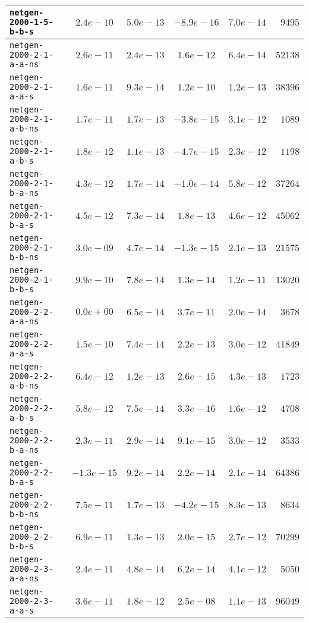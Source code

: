 \begin{center}
\begin{longtable}{|l || c | c | c | c | r|}
\hline
\texttt{netgen-2000-1-5-b-b-s} & $2.4e-10$ & $5.0e-13$ & $-8.9e-16$ & $7.0e-14$ & $9495$ \\
\hline
\texttt{netgen-2000-2-1-a-a-ns} & $2.6e-11$ & $2.4e-13$ & $1.6e-12$ & $6.4e-14$ & $52138$ \\
\hline
\texttt{netgen-2000-2-1-a-a-s} & $1.6e-11$ & $9.3e-14$ & $1.2e-10$ & $1.2e-13$ & $38396$ \\
\hline
\texttt{netgen-2000-2-1-a-b-ns} & $1.7e-11$ & $1.7e-13$ & $-3.8e-15$ & $3.1e-12$ & $1089$ \\
\hline
\texttt{netgen-2000-2-1-a-b-s} & $1.8e-12$ & $1.1e-13$ & $-4.7e-15$ & $2.3e-12$ & $1198$ \\
\hline
\texttt{netgen-2000-2-1-b-a-ns} & $4.3e-12$ & $1.7e-14$ & $-1.0e-14$ & $5.8e-12$ & $37264$ \\
\hline
\texttt{netgen-2000-2-1-b-a-s} & $4.5e-12$ & $7.3e-14$ & $1.8e-13$ & $4.6e-12$ & $45062$ \\
\hline
\texttt{netgen-2000-2-1-b-b-ns} & $3.0e-09$ & $4.7e-14$ & $-1.3e-15$ & $2.1e-13$ & $21575$ \\
\hline
\texttt{netgen-2000-2-1-b-b-s} & $9.9e-10$ & $7.8e-14$ & $1.3e-14$ & $1.2e-11$ & $13020$ \\
\hline
\texttt{netgen-2000-2-2-a-a-ns} & $0.0e+00$ & $6.5e-14$ & $3.7e-11$ & $2.0e-14$ & $3678$ \\
\hline
\texttt{netgen-2000-2-2-a-a-s} & $1.5e-10$ & $7.4e-14$ & $2.2e-13$ & $3.0e-12$ & $41849$ \\
\hline
\texttt{netgen-2000-2-2-a-b-ns} & $6.4e-12$ & $1.2e-13$ & $2.6e-15$ & $4.3e-13$ & $1723$ \\
\hline
\texttt{netgen-2000-2-2-a-b-s} & $5.8e-12$ & $7.5e-14$ & $3.3e-16$ & $1.6e-12$ & $4708$ \\
\hline
\texttt{netgen-2000-2-2-b-a-ns} & $2.3e-11$ & $2.9e-14$ & $9.1e-15$ & $3.0e-12$ & $3533$ \\
\hline
\texttt{netgen-2000-2-2-b-a-s} & $-1.3e-15$ & $9.2e-14$ & $2.2e-14$ & $2.1e-14$ & $64386$ \\
\hline
\texttt{netgen-2000-2-2-b-b-ns} & $7.5e-11$ & $1.7e-13$ & $-4.2e-15$ & $8.3e-13$ & $8634$ \\
\hline
\texttt{netgen-2000-2-2-b-b-s} & $6.9e-11$ & $1.3e-13$ & $2.0e-15$ & $2.7e-12$ & $70299$ \\
\hline
\texttt{netgen-2000-2-3-a-a-ns} & $2.4e-11$ & $4.8e-14$ & $6.2e-14$ & $4.1e-12$ & $5050$ \\
\hline
\texttt{netgen-2000-2-3-a-a-s} & $3.6e-11$ & $1.8e-12$ & $2.5e-08$ & $1.1e-13$ & $96049$ \\

\end{longtable}
\end{center}
